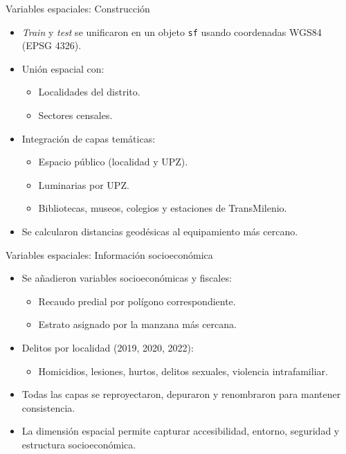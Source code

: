 \documentclass[10pt]{beamer}
\begin{document}
\begin{frame}{Variables espaciales: Construcción}
\begin{itemize}
    \item \textit{Train} y \textit{test} se unificaron en un objeto \texttt{sf} usando coordenadas WGS84 (EPSG 4326).
    \item Unión espacial con:
    \begin{itemize}
        \item Localidades del distrito.
        \item Sectores censales.
    \end{itemize}
    \item Integración de capas temáticas:
    \begin{itemize}
        \item Espacio público (localidad y UPZ).
        \item Luminarias por UPZ.
        \item Bibliotecas, museos, colegios y estaciones de TransMilenio.
    \end{itemize}
    \item Se calcularon distancias geodésicas al equipamiento más cercano.
\end{itemize}
\end{frame}

\begin{frame}{Variables espaciales: Información socioeconómica}
\begin{itemize}
    \item Se añadieron variables socioeconómicas y fiscales:
    \begin{itemize}
        \item Recaudo predial por polígono correspondiente.
        \item Estrato asignado por la manzana más cercana.
    \end{itemize}
    \item Delitos por localidad (2019, 2020, 2022):
    \begin{itemize}
        \item Homicidios, lesiones, hurtos, delitos sexuales, violencia intrafamiliar.
    \end{itemize}
    \item Todas las capas se reproyectaron, depuraron y renombraron para mantener consistencia.
    \item La dimensión espacial permite capturar accesibilidad, entorno, seguridad y estructura socioeconómica.
\end{itemize}
\end{frame}
\end{document}
